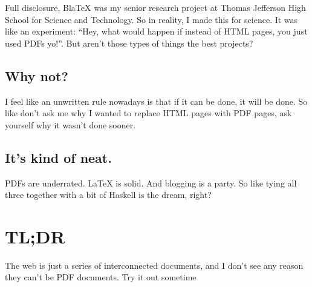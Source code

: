 \documentclass[12pt]{article}
\begin{document}
  Full disclosure, BlaTeX was my senior research project at Thomas Jefferson High School for Science and Technology. So in reality, I made this for science. It was like an experiment: ``Hey, what would happen if instead of HTML pages, you just used PDFs yo!''. But aren't those types of things the best projects?


  \subsection{Why not?}

  I feel like an unwritten rule nowadays is that if it can be done, it will be done. So like don't ask me why I wanted to replace HTML pages with PDF pages, ask yourself why it wasn't done sooner. 

  \subsection{It's kind of neat.}

  PDFs are underrated. LaTeX is solid. And blogging is a party. So like tying all three together with a bit of Haskell is the dream, right?



  \section{TL;DR}

  The web is just a series of interconnected documents, and I don't see any reason they can't be PDF documents. Try it out sometime
\end{document}
